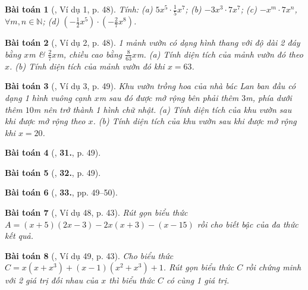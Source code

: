 \documentclass{article}
\numberwithin{equation}{section}
\newtheorem{baitoan}{Bài toán}
\begin{document}
\begin{baitoan}[\cite{SBT_Toan_7_Canh_Dieu_tap_2}, Ví dụ 1, p. 48]
	Tính: (a) $5x^5\cdot\frac{1}{5}x^7$; (b) $-3x^3\cdot7x^7$; (c) $-x^m\cdot7x^n$, $\forall m,n\in\mathbb{N}$; (d) $\left(-\frac{1}{2}x^5\right)\cdot\left(-\frac{2}{7}x^8\right)$.
\end{baitoan}

\begin{baitoan}[\cite{SBT_Toan_7_Canh_Dieu_tap_2}, Ví dụ 2, p. 48]
	1 mảnh vườn có dạng hình thang với độ dài 2 đáy bằng $x$\emph{m} \& $\frac{2}{7}x$\emph{m}, chiều cao bằng $\frac{8}{63}x$\emph{m}. (a) Tính diện tích của mảnh vườn đó theo $x$. (b) Tính diện tích của mảnh vườn đó khi $x = 63$.
\end{baitoan}

\begin{baitoan}[\cite{SBT_Toan_7_Canh_Dieu_tap_2}, Ví dụ 3, p. 49]
	Khu vườn trồng hoa của nhà bác Lan ban đầu có dạng 1 hình vuông cạnh $x$\emph{m} sau đó được mở rộng bên phải thêm $3$\emph{m}, phía dưới thêm $10$\emph{m} nên trở thành 1 hình chữ nhật. (a) Tính diện tích của khu vườn sau khi được mở rộng theo $x$. (b) Tính diện tích của khu vườn sau khi được mở rộng khi $x = 20$.
\end{baitoan}

\begin{baitoan}[\cite{SBT_Toan_7_Canh_Dieu_tap_2}, \textbf{31.}, p. 49]

\end{baitoan}

\begin{baitoan}[\cite{SBT_Toan_7_Canh_Dieu_tap_2}, \textbf{32.}, p. 49]
	
\end{baitoan}

\begin{baitoan}[\cite{SBT_Toan_7_Canh_Dieu_tap_2}, \textbf{33.}, pp. 49--50]
	
\end{baitoan}

\begin{baitoan}[\cite{Tuyen_Toan_7}, Ví dụ 48, p. 43]
	Rút gọn biểu thức $A =  (x + 5)(2x - 3) - 2x(x + 3) - (x - 15)$ rồi cho biết bậc của đa thức kết quả.
\end{baitoan}

\begin{baitoan}[\cite{Tuyen_Toan_7}, Ví dụ 49, p. 43]
	Cho biểu thức $C = x(x + x^3) + (x - 1)(x^2 + x^3) + 1$. Rút gọn biểu thức $C$ rồi chứng minh với 2 giá trị đối nhau của $x$ thì biểu thức $C$ có cùng 1 giá trị.
\end{baitoan}
\end{document}
